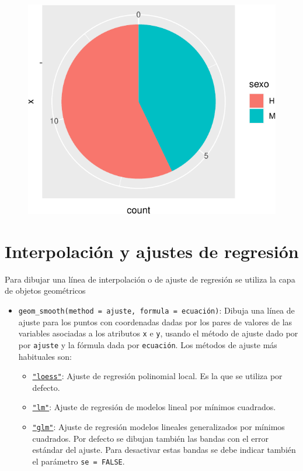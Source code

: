 \documentclass[
  a4paper,
]{scrreport}
\providecommand{\tightlist}{%
  \setlength{\itemsep}{0pt}\setlength{\parskip}{0pt}}\usepackage{longtable,booktabs,array}
\theoremstyle{definition}
\theoremstyle{definition}
\theoremstyle{remark}
\begin{document}
\begin{figure}[H]

{\centering \includegraphics{07-graficos_files/figure-pdf/unnamed-chunk-23-1.pdf}

}

\end{figure}

\hypertarget{interpolaciuxf3n-y-ajustes-de-regresiuxf3n}{%
\section{Interpolación y ajustes de
regresión}\label{interpolaciuxf3n-y-ajustes-de-regresiuxf3n}}

Para dibujar una línea de interpolación o de ajuste de regresión se
utiliza la capa de objetos geométricos

\begin{itemize}
\tightlist
\item
  \texttt{geom\_smooth(method\ =\ ajuste,\ formula\ =\ ecuación)}:
  Dibuja una línea de ajuste para los puntos con coordenadas dadas por
  los pares de valores de las variables asociadas a los atributos
  \texttt{x} e \texttt{y}, usando el método de ajuste dado por por
  \texttt{ajuste} y la fórmula dada por \texttt{ecuación}. Los métodos
  de ajuste más habituales son:

  \begin{itemize}
  \tightlist
  \item
    \href{https://rdrr.io/r/stats/loess.html}{\texttt{"loess"}}: Ajuste
    de regresión polinomial local. Es la que se utiliza por defecto.
  \item
    \href{https://rdrr.io/r/stats/lm.html}{\texttt{"lm"}}: Ajuste de
    regresión de modelos lineal por mínimos cuadrados.
  \item
    \href{https://rdrr.io/r/stats/glm.html}{\texttt{"glm"}}: Ajuste de
    regresión modelos lineales generalizados por mínimos cuadrados. Por
    defecto se dibujan también las bandas con el error estándar del
    ajuste. Para desactivar estas bandas se debe indicar también el
    parámetro \texttt{se\ =\ FALSE}.
  \end{itemize}
\end{itemize}
\end{document}
